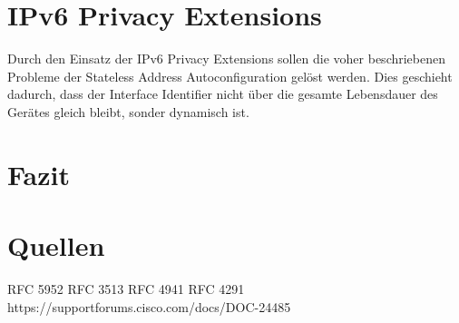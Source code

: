 \documentclass[a4paper, 12pt]{scrartcl}
\begin{document}
\section{IPv6 Privacy Extensions}
Durch den Einsatz der IPv6 Privacy Extensions sollen die voher beschriebenen Probleme der Stateless Address Autoconfiguration gelöst werden.
Dies geschieht dadurch, dass der Interface Identifier nicht über die gesamte Lebensdauer des Gerätes gleich bleibt, sonder dynamisch ist.

\section{Fazit}
\newpage

\section{Quellen}
RFC 5952
RFC 3513
RFC 4941
RFC 4291
https://supportforums.cisco.com/docs/DOC-24485
{}


\end{document}
